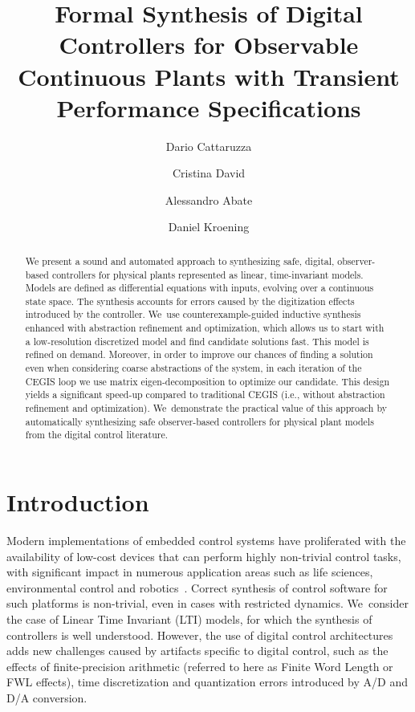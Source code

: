 \documentclass[a4paper,UKenglish]{lipics-v2018}
\title{Formal Synthesis of Digital Controllers for Observable Continuous
Plants with Transient Performance Specifications}
\author{Dario Cattaruzza}{University of Oxford}{}{}{}
\author{Cristina David}{University of Cambridge, Diffblue}{}{}{}
\author{Alessandro Abate}{University of Oxford}{}{}{}
\author{Daniel Kroening}{University of Oxford, Diffblue}{}{}{}
\begin{document}
\maketitle


\begin{abstract} 
%
We present a sound and automated approach to synthesizing safe, digital,
observer-based controllers for physical plants represented as linear,
time-invariant models.  Models are defined as differential equations with
inputs, evolving over a continuous state space.  The synthesis accounts for
errors caused by the digitization effects introduced by the controller. 
We~use counterexample-guided inductive synthesis enhanced with abstraction
refinement and optimization, which allows us to start with a low-resolution
discretized model and find candidate solutions fast.  This model is refined
on demand.  Moreover, in order to improve our chances of finding a solution
even when considering coarse abstractions of the system, in each iteration
of the CEGIS loop we use matrix eigen-decomposition to optimize our
candidate.
%
%
This design yields a significant speed-up compared to traditional CEGIS
(i.e., without abstraction refinement and optimization).  We~demonstrate the
practical value of this approach by automatically synthesizing safe
observer-based controllers for physical plant models from the digital
control literature.
%
\end{abstract}

\section{Introduction}

Modern implementations of embedded control systems have proliferated with
the availability of low-cost devices that can perform highly non-trivial
control tasks, with significant impact in numerous application areas such as
life sciences, environmental control and robotics~\cite{astrom1997computer,
Franklin15}.  Correct synthesis of control software for such platforms is
non-trivial, even in cases with restricted dynamics.  We~consider the case
of Linear Time Invariant (LTI) models, for which the synthesis of
controllers is well understood.  However, the use of digital control
architectures adds new challenges caused by artifacts specific to digital
control, such as the effects of finite-precision arithmetic (referred to
here as Finite Word Length or FWL effects), time discretization and
quantization errors introduced by A/D and D/A conversion.
\end{document}
